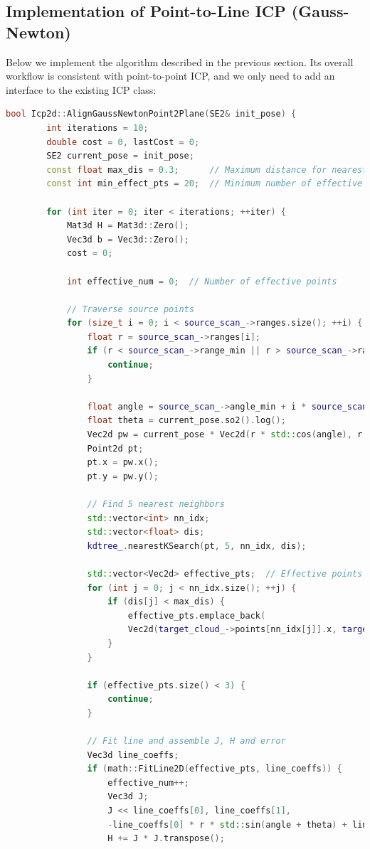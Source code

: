 \subsection{Implementation of Point-to-Line ICP (Gauss-Newton)}
Below we implement the algorithm described in the previous section. Its overall workflow is consistent with point-to-point ICP, and we only need to add an interface to the existing ICP class:

\begin{lstlisting}[language=c++,caption=src/ch6/icp\_2d.cc]
	bool Icp2d::AlignGaussNewtonPoint2Plane(SE2& init_pose) {
		int iterations = 10;
		double cost = 0, lastCost = 0;
		SE2 current_pose = init_pose;
		const float max_dis = 0.3;      // Maximum distance for nearest neighbors
		const int min_effect_pts = 20;  // Minimum number of effective points
		
		for (int iter = 0; iter < iterations; ++iter) {
			Mat3d H = Mat3d::Zero();
			Vec3d b = Vec3d::Zero();
			cost = 0;
			
			int effective_num = 0;  // Number of effective points
			
			// Traverse source points
			for (size_t i = 0; i < source_scan_->ranges.size(); ++i) {
				float r = source_scan_->ranges[i];
				if (r < source_scan_->range_min || r > source_scan_->range_max) {
					continue;
				}
				
				float angle = source_scan_->angle_min + i * source_scan_->angle_increment;
				float theta = current_pose.so2().log();
				Vec2d pw = current_pose * Vec2d(r * std::cos(angle), r * std::sin(angle));
				Point2d pt;
				pt.x = pw.x();
				pt.y = pw.y();
				
				// Find 5 nearest neighbors
				std::vector<int> nn_idx;
				std::vector<float> dis;
				kdtree_.nearestKSearch(pt, 5, nn_idx, dis);
				
				std::vector<Vec2d> effective_pts;  // Effective points
				for (int j = 0; j < nn_idx.size(); ++j) {
					if (dis[j] < max_dis) {
						effective_pts.emplace_back(
						Vec2d(target_cloud_->points[nn_idx[j]].x, target_cloud_->points[nn_idx[j]].y));
					}
				}
				
				if (effective_pts.size() < 3) {
					continue;
				}
				
				// Fit line and assemble J, H and error
				Vec3d line_coeffs;
				if (math::FitLine2D(effective_pts, line_coeffs)) {
					effective_num++;
					Vec3d J;
					J << line_coeffs[0], line_coeffs[1],
					-line_coeffs[0] * r * std::sin(angle + theta) + line_coeffs[1] * r * std::cos(angle + theta);
					H += J * J.transpose();
					

\end{lstlisting}
